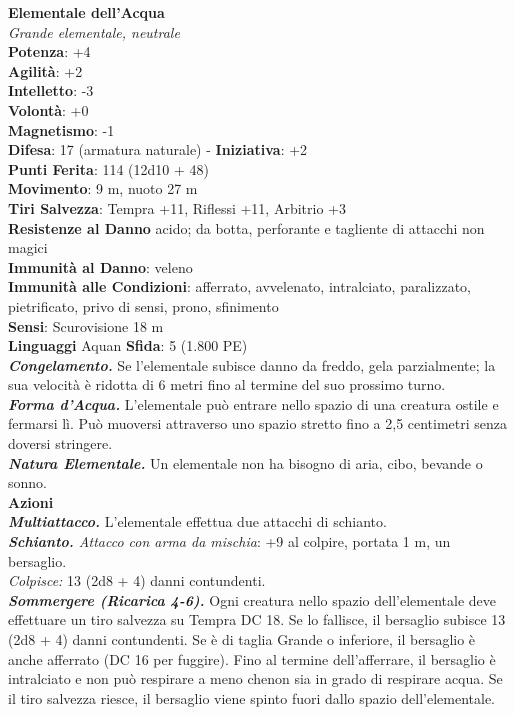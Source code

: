 \begin{multicols}{2}
\medskip\textbf{Elementale dell'Acqua}\\
\emph{Grande elementale, neutrale}\\
\textbf{Potenza}: +4\\
\textbf{Agilità}: +2\\
\textbf{Intelletto}: -3\\
\textbf{Volontà}: +0\\
\textbf{Magnetismo}: -1\\
\textbf{Difesa}: 17 (armatura naturale) - \textbf{Iniziativa}: +2\\
\textbf{Punti Ferita}: 114 (12d10 + 48)\\
\textbf{Movimento}: 9 m, nuoto 27 m\\
\textbf{Tiri Salvezza}: Tempra +11, Riflessi +11, Arbitrio +3\\
\textbf{Resistenze al Danno} acido; da botta, perforante e tagliente di attacchi non magici\\
\textbf{Immunità al Danno}: veleno\\
\textbf{Immunità alle Condizioni}: afferrato, avvelenato, intralciato, paralizzato, pietrificato, privo di sensi, prono, sfinimento\\
\textbf{Sensi}: Scurovisione 18 m\\
\textbf{Linguaggi} Aquan
\textbf{Sfida}: 5 (1.800 PE)\smallskip\\
\emph{\textbf{Congelamento.}} Se l'elementale subisce danno da freddo, gela parzialmente; la sua velocità è ridotta di 6 metri fino al termine del suo prossimo turno.\\
\emph{\textbf{Forma d'Acqua.}} L'elementale può entrare nello spazio di una creatura ostile e fermarsi lì. Può muoversi attraverso uno spazio stretto fino a 2,5 centimetri senza doversi stringere.\\
\emph{\textbf{Natura Elementale.}} Un elementale non ha bisogno di aria, cibo, bevande o sonno.\\
\smallskip\textbf{Azioni}\\
\emph{\textbf{Multiattacco.}} L'elementale effettua due attacchi di schianto.\\
\emph{\textbf{Schianto.} Attacco con arma da mischia}: +9 al colpire, portata 1 m, un bersaglio.\\
\emph{Colpisce:} 13 (2d8 + 4) danni contundenti.\\
\emph{\textbf{Sommergere (Ricarica 4-6).}} Ogni creatura nello spazio dell'elementale deve effettuare un tiro salvezza su Tempra DC  18. Se lo fallisce, il bersaglio subisce 13 (2d8 + 4) danni contundenti. Se è di taglia Grande o inferiore, il bersaglio è anche afferrato (DC  16 per fuggire). Fino al termine dell'afferrare, il bersaglio è intralciato e non può respirare a meno chenon sia in grado di respirare acqua. Se il  tiro salvezza riesce, il bersaglio viene spinto fuori dallo spazio dell'elementale.\\

\end{multicols}
